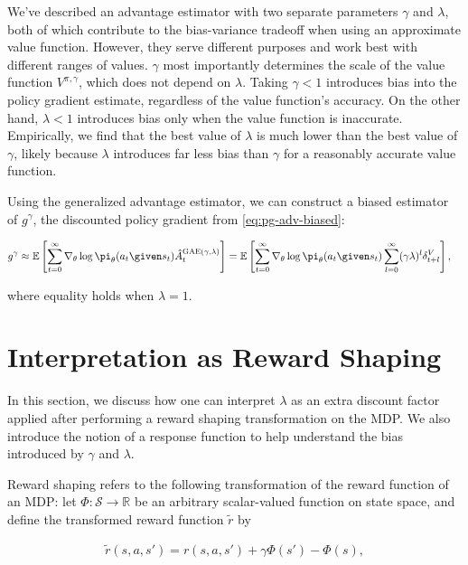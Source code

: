 We've described an advantage estimator with two separate parameters $\gamma$ and $\lambda$, both of which contribute to the bias-variance tradeoff when using an approximate value function. However, they serve different purposes and work best with different ranges of values.
$\gamma$ most importantly determines the scale of the value function $V^{\pi,\gamma}$, which does not depend on $\lambda$.
Taking $\gamma < 1$ introduces bias into the policy gradient estimate, regardless of the value function's accuracy. On the other hand, $\lambda < 1$ introduces bias only when the value function is inaccurate. Empirically, we find that the best value of $\lambda$ is much lower than the best value of $\gamma$, likely because $\lambda$ introduces far less bias than $\gamma$ for a reasonably accurate value function.

Using the generalized advantage estimator, we can construct a biased estimator of $g^{\gamma}$, the discounted policy gradient from \ref{eq:pg-adv-biased}:

\begin{align}
g^{\gamma} &\approx \mathbb{E}\left[\sum_{t=0}^{\infty} \nabla_{\theta} \log \pi_{\theta}(a_t \given s_t) \hat{A}^{\mathrm{GAE(\gamma,\lambda)}}_t\right]
= \mathbb{E}\left[\sum_{t=0}^{\infty} \nabla_{\theta} \log \pi_{\theta}(a_t \given s_t) \sum_{l=0}^{\infty} (\gamma \lambda)^{l}\delta^V_{t+l}\right],
\label{eq:pg-gae1}
\end{align}

where equality holds when $\lambda=1$.

\section{Interpretation as Reward Shaping}
\label{sec:shaping}

In this section, we discuss how one can interpret $\lambda$ as an extra discount factor applied after performing a reward shaping transformation on the MDP. We also introduce the notion of a response function to help understand the bias introduced by $\gamma$ and $\lambda$.

Reward shaping \citep{ng1999policy} refers to the following transformation of the reward function of an MDP: let $\Phi: \mathcal{S} \rightarrow \mathbb{R}$ be an arbitrary scalar-valued function on state space, and define the transformed reward function $\tilde{r}$ by

\begin{align}
\tilde{r}(s,a,s') = r(s,a,s') + \gamma \Phi(s') - \Phi(s), \label{eq:reshaping}
\end{align}

